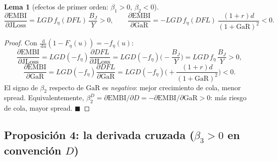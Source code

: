 \documentclass[11pt]{article}
\theoremstyle{plain}
\newtheorem{lemma}{Lema}
\theoremstyle{definition}
\newcommand{\JLoss}{\mathrm{JLoss}}
\newcommand{\EMBI}{\mathrm{EMBI}}
\newcommand{\GaR}{\mathrm{GaR}}
\newcommand{\1}{\mathbf{1}}
\newcommand{\dd}{\,\mathrm{d}}
\begin{document}
\begin{lemma}[efectos de primer orden: $\beta_1>0$, $\beta_2<0$]\label{lem:first}
\[
\frac{\partial \EMBI}{\partial \JLoss}=LGD\,f_\eta(DFL)\,\frac{B_J}{Y}>0,\qquad
\frac{\partial \EMBI}{\partial \GaR}=-LGD\,f_\eta(DFL)\,\frac{(1+r)d}{(1+\GaR)^2}<0.
\]
\end{lemma}
\begin{proof}
Con $\frac{\dd}{\dd u}(1-F_\eta(u))=-f_\eta(u)$:
\[
\frac{\partial \EMBI}{\partial \JLoss}=LGD(-f_\eta)\frac{\partial DFL}{\partial\JLoss}=LGD(-f_\eta)\Big(-\frac{B_J}{Y}\Big)=LGD\,f_\eta\,\frac{B_J}{Y}>0,
\]
\[
\frac{\partial \EMBI}{\partial \GaR}=LGD(-f_\eta)\frac{\partial DFL}{\partial\GaR}=LGD(-f_\eta)\Big(\!+\frac{(1+r)d}{(1+\GaR)^2}\Big)<0.
\]
El signo de $\beta_2$ respecto de $\GaR$ es \emph{negativo}: mejor crecimiento de cola, menor spread. Equivalentemente, $\beta_2^{D}=\partial\EMBI/\partial D=-\partial\EMBI/\partial\GaR>0$: más riesgo de cola, mayor spread. $\blacksquare$
\end{proof}

\subsection{Proposición 4: la derivada cruzada ($\beta_3>0$ en convención $D$)}
\end{document}
